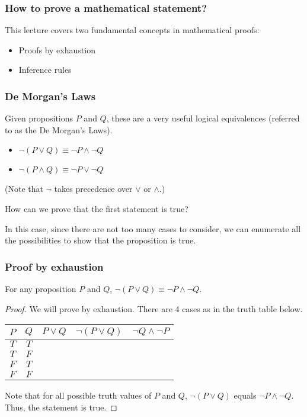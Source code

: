 

\begin{frame}\frametitle{How to prove a mathematical statement?}
  This lecture covers two fundamental concepts in mathematical proofs:
  \begin{itemize}
  \item Proofs by exhaustion
  \item Inference rules
  \end{itemize}
\end{frame}

\begin{frame}\frametitle{De Morgan's Laws}
  Given propositions $P$ and $Q$, these are a very useful logical
  equivalences (referred to as the De Morgan's Laws).

  \begin{itemize}
  \item $\neg (P\vee Q)\equiv \neg P \wedge \neg Q$
  \item $\neg (P\wedge Q)\equiv \neg P \vee \neg Q$
  \end{itemize}

  (Note that $\neg$ takes precedence over $\vee$ or $\wedge$.)

  \vspace{0.2in}
  
  How can we prove that the first statement is true?
  \pause

  In this case, since there are not too many cases to consider, we can
  enumerate all the possibilities to show that the proposition is
  true.
\end{frame}

\begin{frame}\frametitle{Proof by exhaustion}
  \begin{tcolorbox}
    For any proposition $P$ and $Q$, $\neg (P\vee Q)\equiv \neg P
    \wedge \neg Q$.
  \end{tcolorbox}
  \begin{proof}
    We will prove by exhaustion.  \pause There are 4 cases as in the truth
    table below.

    \vspace{0.1in}
    
    \begin{tabular}{|c|c||c|c|c|}
      \hline
      $P$ & $Q$ & $P\vee Q$ & $\neg(P\vee Q)$ & $\neg Q \wedge \neg P$ \\
      \hline
      $T$ & $T$ & & & \\
      $T$ & $F$ & & & \\
      $F$ & $T$ & & & \\
      $F$ & $F$ & & & \\
      \hline
    \end{tabular}

    \vspace{0.1in}
    \pause

    Note that for all possible truth values of $P$ and $Q$, $\neg
    (P\vee Q)$ equals $\neg P \wedge \neg Q$.  Thus, the statement is
    true.
  \end{proof}
\end{frame}

